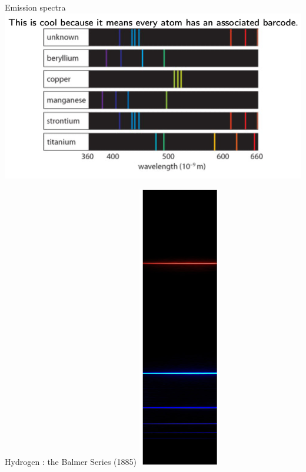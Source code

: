  \begin{frame}{Emission spectra}
\small
\includegraphics[scale=0.4]{spec6}

\end{frame}

 \begin{frame}{Hydrogen : the Balmer Series (1885)}
\small
\includegraphics[scale=0.35]{spec7}

\end{frame}

